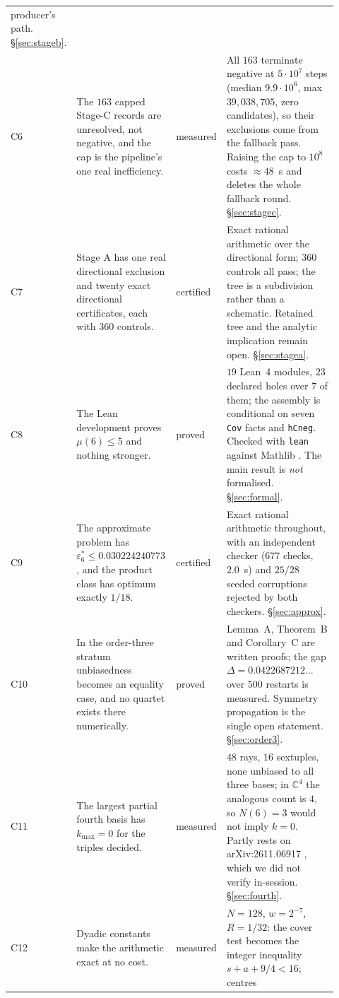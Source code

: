 \documentclass[10pt]{article}
\theoremstyle{definition}
\newcommand{\C}{\mathbb{C}}
\newcommand{\file}[1]{\texttt{\small #1}}
\newcommand{\status}[1]{\textsf{\small #1}}
\begin{document}
{\begin{longtable}{@{}L{0.045\linewidth}L{0.315\linewidth}L{0.105\linewidth}L{0.455\linewidth}@{}}
producer's path. \S\ref{sec:stageb}. \\
C6 & The $163$ capped Stage-C records are unresolved, not negative, and the cap is the pipeline's one
real inefficiency. &
\status{measured} &
All $163$ terminate negative at $5\cdot10^7$ steps (median $9.9\cdot10^6$, max $39{,}038{,}705$,
zero candidates), so their exclusions come from the fallback pass. Raising the cap to $10^8$ costs
$\approx48$~s and deletes the whole fallback round. \S\ref{sec:stagec}. \\
C7 & Stage A has one real directional exclusion and twenty exact directional certificates, each with
$360$ controls. &
\status{certified} &
Exact rational arithmetic over the directional form; $360$ controls all pass; the tree is a subdivision
rather than a schematic. Retained tree and the analytic implication remain open. \S\ref{sec:stagea}. \\
C8 & The Lean development proves $\mu(6)\le5$ and nothing stronger. &
\status{proved} &
$19$ Lean~4 modules, $23$ declared holes over $7$ of them; the assembly is conditional on seven \texttt{Cov}
facts and \texttt{hCneg}. Checked with \file{lean} against Mathlib \cite{lean4}. The main result is
\emph{not} formalised. \S\ref{sec:formal}. \\
C9 & The approximate problem has $\varepsilon_6^*\le0.030224240773$, and the product class has optimum
exactly $1/18$. &
\status{certified} &
Exact rational arithmetic throughout, with an independent checker ($677$ checks, $2.0$~s) and
$25/28$ seeded corruptions rejected by both checkers. \S\ref{sec:approx}. \\
C10 & In the order-three stratum unbiasedness becomes an equality case, and no quartet exists there
numerically. &
\status{proved} &
Lemma~A, Theorem~B and Corollary~C are written proofs; the gap $\Delta=0.0422687212\ldots$ over $500$
restarts is \status{measured}. Symmetry propagation is the single open statement. \S\ref{sec:order3}. \\
C11 & The largest partial fourth basis has $k_{\max}=0$ for the triples decided. &
\status{measured} &
$48$ rays, $16$ sextuples, none unbiased to all three bases; in $\C^4$ the analogous count is $4$, so
$N(6)=3$ would not imply $k=0$. Partly rests on arXiv:2611.06917 \cite{wuttig26}, which we did not
verify in-session. \S\ref{sec:fourth}. \\
C12 & Dyadic constants make the arithmetic exact at no cost. &
\status{measured} &
$N=128$, $w=2^{-7}$, $R=1/32$: the cover test becomes the integer inequality $s+a+9/4<16$; centres

\end{longtable}}
\end{document}

